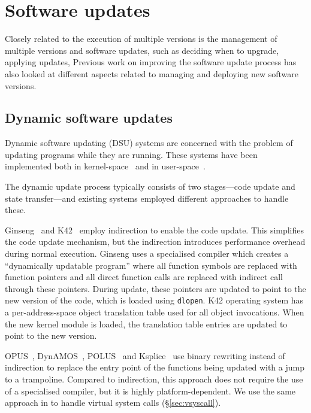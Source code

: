 \section{Software updates}

Closely related to the execution of multiple versions is the management of
multiple versions and software updates, such as deciding when to upgrade,
applying updates, \etc Previous work on improving the software update process
has also looked at different aspects related to managing and deploying new
software versions.

\subsection{Dynamic software updates}

Dynamic software updating (DSU) systems are concerned with the problem of
updating programs while they are running. These systems have been implemented
both in kernel-space~\cite{k42,dynamos,ksplice,proteos} and in
user-space~\cite{opus,ginseng,polus,upstare,ekiden,kitsune}.

The dynamic update process typically consists of two stages---code update and
state transfer---and existing systems employed different approaches to handle
these.

Ginseng~\cite{ginseng} and K42~\cite{k42} employ indirection to enable the code
update. This simplifies the code update mechanism, but the indirection
introduces performance overhead during normal execution. Ginseng uses a
specialised compiler which creates a ``dynamically updatable program'' where
all function symbols are replaced with function pointers and all direct
function calls are replaced with indirect call through these pointers. During
update, these pointers are updated to point to the new version of the code,
which is loaded using \lstinline`dlopen`. K42 operating system has a
per-address-space object translation table used for all object invocations.
When the new kernel module is loaded, the translation table entries are updated
to point to the new version.

OPUS~\cite{opus}, DynAMOS~\cite{dynamos}, POLUS~\cite{polus} and
Ksplice~\cite{ksplice} use binary rewriting instead of indirection to replace
the entry point of the functions being updated with a jump to a trampoline.
Compared to indirection, this approach does not require the use of a
specialised compiler, but it is highly platform-dependent. We use the same
approach in \varan to handle virtual system calls (\S\ref{sec:vsyscall}).


